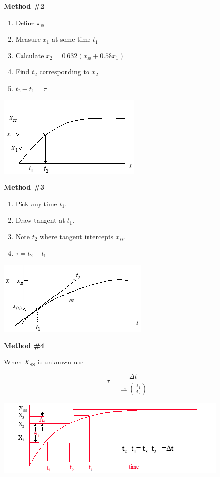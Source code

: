 \documentclass[
]{book}
\providecommand{\tightlist}{%
  \setlength{\itemsep}{0pt}\setlength{\parskip}{0pt}}
\begin{document}
\textbf{Method \#2}

\begin{enumerate}
\def\labelenumi{\arabic{enumi}.}
\tightlist
\item
  Define \(x_{\mathrm{ss}}\)
\item
  Measure \(x_1\) at some time \(t_1\)
\item
  Calculate \(x_2 = 0.632 \left( x_{\mathrm{ss}} + 0.58 x_1 \right)\)
\item
  Find \(t_2\) corresponding to \(x_2\)
\item
  \(t_2 - t_1 = \tau\)
\end{enumerate}

\includegraphics{media/08/image21.png}

\textbf{Method \#3}

\begin{enumerate}
\def\labelenumi{\arabic{enumi}.}
\tightlist
\item
  Pick any time \(t_1\).
\item
  Draw tangent at \(t_1\).
\item
  Note \(t_2\) where tangent intercepts \(x_{\mathrm{ss}}\).
\item
  \(\tau = t_2 -t_1\)
\end{enumerate}

\includegraphics{media/08/image22.png}

\textbf{Method \#4}

When \(X_{\mathrm{SS}}\) is unknown use

\[\tau = \frac{\Delta t}{\ln \left( \frac{A_1}{A_2} \right)} \]

\includegraphics{media/08/image24.png}
\end{document}
